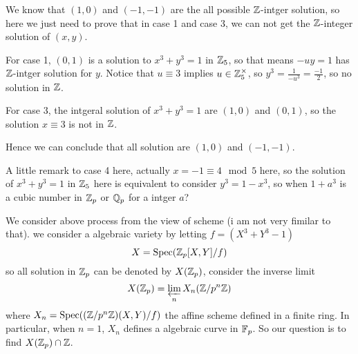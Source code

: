     We know that \((1,0)\) and \((-1,-1)\) are the all possible \(\mathbb{Z}\)-intger solution, so here we just need to prove that in case 1 and case 3, we can not get the \(\mathbb{Z}\)-integer solution of \((x,y)\).

    For case 1, \((0,1)\) is a solution to \(x^3+y^3=1\) in \(\mathbb{Z}_5\), so that means \(-uy=1\) has \(\mathbb{Z}\)-intger solution for \(y\). Notice that \(u \equiv 3\) implies \(u \in \mathbb{Z}_5^{\times}\), so \(y^3=\frac{1}{-u^3} = \frac{-1}{2}\), so no solution in \(\mathbb{Z}\).

    For case 3, the intgeral solution of \(x^3+y^3=1\) are \((1,0)\) and \((0,1)\), so the solution \(x \equiv 3\) is not in \(\mathbb{Z}\).

    Hence we can conclude that all solution are \((1,0)\) and \((-1,-1)\).

    \begin{remark}
        A little remark to case 4 here, actually \(x=-1 \equiv 4 \mod 5\) here, so the solution of \(x^3+y^3=1\) in \(\mathbb{Z}_5\) here is equivalent to consider \(y^3=1-x^3\), so when \(1+a^3\) is a cubic number in \(\mathbb{Z}_p\) or \(\mathbb{Q}_p\) for a intger \(a\)?
    \end{remark}

    We consider above process from the view of scheme (i am not very fimilar to that).
    we consider a algebraic variety by letting \(f = (X^3+Y^3-1)\)
    \[X = \text{Spec}(\mathbb{Z}_p[X,Y]/f)\]
    so all solution in \(\mathbb{Z}_p\) can be denoted by \(X(\mathbb{Z}_p)\), consider the inverse limit
    \[X(\mathbb{Z}_p) = \varprojlim_{n} X_n(\mathbb{Z}/p^n\mathbb{Z})\]
    where \(X_n = \text{Spec}((\mathbb{Z}/p^n\mathbb{Z})(X,Y)/f)\) the affine scheme defined in a finite ring. In particular, when \(n=1\), \(X_n\) defines a algebraic curve in \(\mathbb{F}_p\). So our question is to find \(X(\mathbb{Z}_p) \cap \mathbb{Z}\).